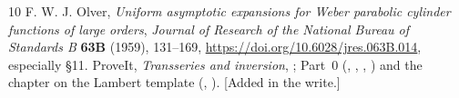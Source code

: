 \begin{thebibliography}{10}
F. W. J. Olver, \emph{Uniform asymptotic expansions for Weber parabolic cylinder functions of large orders},
\emph{Journal of Research of the National Bureau of Standards B} \textbf{63B} (1959), 131--169,
\url{https://doi.org/10.6028/jres.063B.014}, especially \S11.
ProveIt, \emph{Transseries and inversion}, ; Part~0 (, , , ) and the chapter on the Lambert template (, ). [Added in the write.]
\end{thebibliography}
